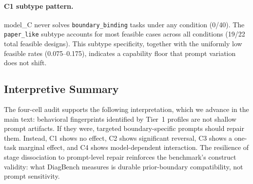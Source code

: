 \paragraph{C1 subtype pattern.} model_C never solves \texttt{boundary\_binding} tasks under any condition (0/40). The \texttt{paper\_like} subtype accounts for most feasible cases across all conditions (19/22 total feasible designs). This subtype specificity, together with the uniformly low feasible rates (0.075--0.175), indicates a capability floor that prompt variation does not shift.

\subsection{Interpretive Summary}

The four-cell audit supports the following interpretation, which we advance in the main text: behavioral fingerprints identified by Tier~1 profiles are not shallow prompt artifacts. If they were, targeted boundary-specific prompts should repair them. Instead, C1 shows no effect, C2 shows significant reversal, C3 shows a one-task marginal effect, and C4 shows model-dependent interaction. The resilience of stage dissociation to prompt-level repair reinforces the benchmark's construct validity: what DiagBench measures is durable prior-boundary compatibility, not prompt sensitivity.
